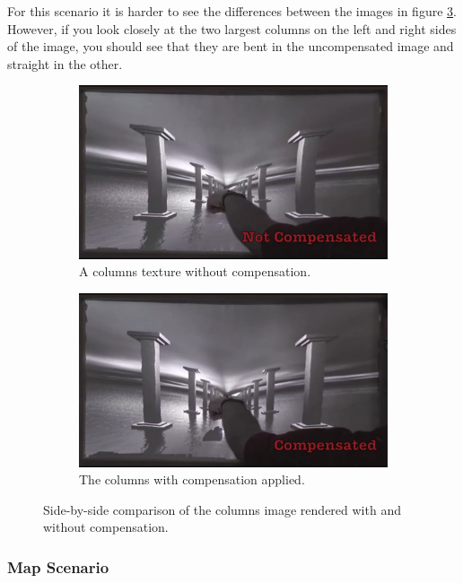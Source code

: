 \documentclass[]{article}
\begin{document}
For this scenario it is harder to see the differences between the images in figure \ref{fig:ColumnsComparison}. However, if you look closely at the two largest columns on the left and right sides of the image, you should see that they are bent in the uncompensated image and straight in the other.

\begin{figure}[!h]
\centering
\begin{subfigure}{.5\textwidth}
  \centering
  \includegraphics[width=0.9\linewidth]{figures/compensation/ColumnsNotCompensated.png}
  \caption{A columns texture without compensation.}
  \label{fig:ColumnsNotCompensated}
\end{subfigure}%
\begin{subfigure}{.5\textwidth}
  \centering
  \includegraphics[width=0.9\linewidth]{figures/compensation/ColumnsCompensated.png}
  \caption{The columns with compensation applied.}
  \label{fig:ColumnsCompensated}
\end{subfigure}
\caption{Side-by-side comparison of the columns image rendered with and without compensation.}
\label{fig:ColumnsComparison}
\end{figure}

\subsubsection{Map Scenario}
\end{document}
